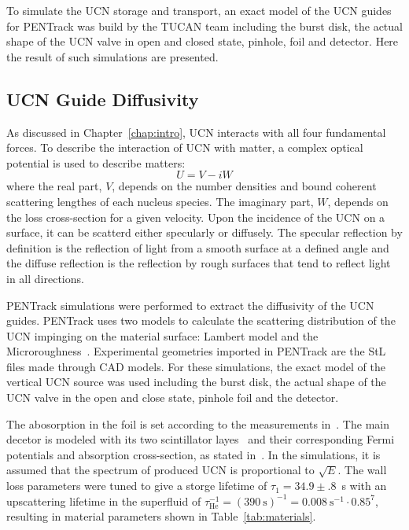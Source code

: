 To simulate the UCN storage and transport, an exact model of the UCN
guides for PENTrack was build by the TUCAN team including the burst
disk, the actual shape of the UCN valve in open and closed state,
pinhole, foil and detector. Here the result of such simulations are
presented.
\subsection{UCN Guide Diffusivity\label{sec:diffusivity}}
As discussed in Chapter~\ref{chap:intro}, UCN interacts with all four
fundamental forces. To describe the interaction of UCN with matter, a
complex optical potential is used to describe matters:
\begin{equation}
  \label{eqn:fermipotential}
  U = V - iW
\end{equation}
where the real part, $V$, depends on the number densities and bound
coherent scattering lengthes of each nucleus species. The imaginary
part, $W$, depends on the loss cross-section for a given velocity.
Upon the incidence of the UCN on a surface, it can be scatterd either
specularly or diffusely. The specular reflection by definition is the
reflection of light from a smooth surface at a defined angle and the
diffuse reflection is the reflection by rough surfaces that tend to
reflect light in all directions.

PENTrack simulations were performed to extract the diffusivity of the
UCN guides. PENTrack uses two models to calculate the scattering
distribution of the UCN impinging on the material surface: Lambert
model and the Microroughness~\cite{Steyerl1972}. Experimental
geometries imported in PENTrack are the StL files made through CAD
models. For these simulations, the exact model of the vertical UCN
source was used including the burst disk, the actual shape of the UCN
valve in the open and close state, pinhole foil and the detector.

The abosorption in the foil is set according to the measurements
in~\cite{atchison2009transmission}. The main decetor is modeled with
its two scintillator layes~\cite{jamieson2017characterization} and
their corresponding Fermi potentials and absorption cross-section, as
stated in~\cite{Ban2016}.  In the simulations, it is assumed that the
spectrum of produced UCN is proportional to $\sqrt{E}$. The wall loss
parameters were tuned to give a storge lifetime of
$\tau_1 = 34.9 \pm .8$~s with an upscattering lifetime in the
superfluid of
$\tau_{\mathrm{He}}^{-1} = (390~\mathrm{s})^{-1} =
0.008~\mathrm{s}^{-1}\cdot 0.85^{7}$, resulting in material parameters
shown in Table~\ref{tab:materials}.


